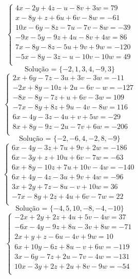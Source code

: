 \documentclass[12pt,oneside,a4paper]{article}
\begin{document}
\vspace{\baselineskip}
\begin{equation*}
\begin{cases}
4x-2y+4z-u-8v+3w=79 \\
x-8y+z+6u+6v-8w=-61 \\
10x-6y-8z-7u-7v-8w=-39 \\
-9x-5y-9z+4u-8v+4w=86 \\
7x-8y-8z-5u+9v+9w=-120 \\
-5x-8y-3z-u-10v-10w=49 \\
\end{cases}
\end{equation*}
\begin{equation*}
\text{Solução = }\{-2,1,3,4,-9,3\}
\end{equation*}
\vspace{\baselineskip}
\begin{equation*}
\begin{cases}
2x+6y-7z-3u+3v-3w=-11 \\
-2x+8y-10z+2u-6v-w=-127 \\
-8x-8y-7z+u+6v-3w=109 \\
-7x-8y+8z+9u-4v-8w=116 \\
6x-4y-3z-4u+v+5w=-29 \\
8x+8y-9z-2u-7v+6w=-206 \\
\end{cases}
\end{equation*}
\begin{equation*}
\text{Solução = }\{-2,-6,4,-2,8,-9\}
\end{equation*}
\vspace{\baselineskip}
\begin{equation*}
\begin{cases}
6x-4y-3z+7u+9v+2w=-186 \\
6x-3y+z+10u+6v-7w=-63 \\
6x+8y-10z+7u+10v-4w=-140 \\
6x+4y-4z-3u+9v+4w=-96 \\
3x+2y+7z-8u-v+10w=36 \\
-7x-8y+2z+4u+6v-7w=22 \\
\end{cases}
\end{equation*}
\begin{equation*}
\text{Solução = }\{-4,5,10,-8,-4,-10\}
\end{equation*}
\vspace{\baselineskip}
\begin{equation*}
\begin{cases}
-2x+2y+2z+4u+5v-4w=37 \\
-6x-4y-9z+8u-3v+8w=-71 \\
2x+y+z-6u-4v+9w=10 \\
6x+10y-6z+8u-v+6w=-119 \\
3x-6y-7z+2u-7v-4w=-131 \\
10x-3y+2z+2u+8v-9w=-54 \\
\end{cases}
\end{equation*}
\end{document}
